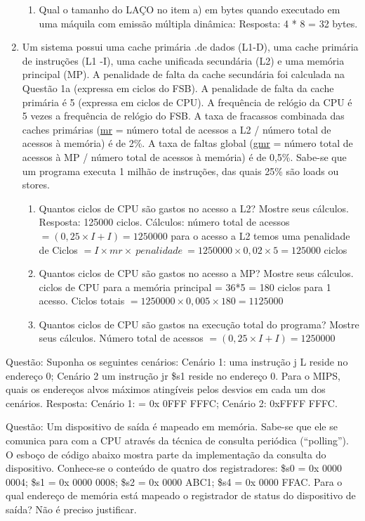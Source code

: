 \documentclass{article}
\begin{document}
\begin{enumerate}
\begin{enumerate}
\item Qual o tamanho do LAÇO no item a) em bytes quando executado em uma máquila
com emissão múltipla dinâmica: Resposta: 4 * 8 = 32 bytes.
\end{enumerate}

\item Um sistema possui uma cache primária .de dados (L1-D), uma cache primária
de instruções (L1 -I), uma cache unificada secundária (L2) e uma memória
principal (MP). A penalidade de falta da cache secundária foi calculada na
Questão 1a (expressa em ciclos do FSB). A penalidade de falta da cache primária
é 5 (expressa em ciclos de CPU). A frequência de relógio da CPU é 5 vezes a
frequência de relógio do FSB. A taxa de fracassos combinada das caches primárias
(\underline{mr} = número total de acessos a L2 / número total de acessos à
memória) é de 2\%. A taxa de faltas global (\underline{gmr} = número total de
acessos à MP / número total de acessos à memória) é de 0,5\%. Sabe-se que um
programa executa 1 milhão de instruções, das quais 25\% são loads ou stores.

\begin{enumerate}
\item Quantos ciclos de CPU são gastos no acesso a L2? Mostre seus cálculos.
Resposta: 125000 ciclos. Cálculos: número total de acessos $= (0,25 \times I +
I) = 1250000$ para o acesso a L2 temos uma penalidade de Ciclos $= I \times mr
\times\ penalidade\ = 1250000 \times 0,02 \times 5 = 125000$ ciclos

\item Quantos ciclos de CPU são gastos no acesso a MP? Mostre seus cálculos.
ciclos de CPU para a memória principal = 36*5 = 180 ciclos para 1 acesso. Ciclos
totais $= 1250000 \times 0,005 \times 180 = 1125000$

\item Quantos ciclos de CPU são gastos na execução total do programa? Mostre
seus cálculos. Número total de acessos $= (0,25 \times I + I) = 1250000$
\end{enumerate}
\end{enumerate}


Questão: Suponha os seguintes cenários: Cenário 1: uma instrução j L reside no
endereço 0; Cenário 2 um instrução jr \$s1 reside no endereço 0. Para o MIPS,
quais os endereços alvos máximos atingíveis pelos desvios em cada um dos
cenários. Resposta: Cenário 1: = 0x 0FFF FFFC; Cenário 2: 0xFFFF FFFC.

Questão: Um dispositivo de saída é mapeado em memória. Sabe-se que ele se
comunica para com a CPU através da técnica de consulta periódica (“polling”). O
esboço de código abaixo mostra parte da implementação da consulta do
dispositivo. Conhece-se o conteúdo de quatro dos registradores: \$s0 = 0x 0000
0004; \$s1 = 0x 0000 0008; \$s2 = 0x 0000 ABC1; \$s4 = 0x 0000 FFAC. Para o qual
endereço de memória está mapeado o registrador de status do dispositivo de
saída? Não é preciso justificar.
\end{document}
